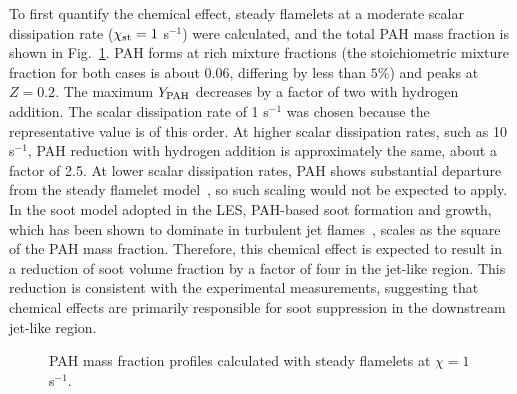 \documentclass[review,3p,times]{elsarticle}
\begin{document}
To first quantify the chemical effect, steady flamelets at a moderate scalar dissipation rate ($\chi_{\rm st} = 1$ s$^{-1}$) were calculated, and the total PAH mass fraction is shown in Fig.~\ref{fig:flamelet}.  PAH forms at rich mixture fractions (the stoichiometric mixture fraction for both cases is about $0.06$, differing by less than $5$\%) and peaks at $Z = 0.2$.  The maximum $Y_{\rm PAH}$ decreases by a factor of two with hydrogen addition.  \textcolor{Rv1}{The scalar dissipation rate of 1 s$^{-1}$ was chosen because the representative value is of this order.  At higher scalar dissipation rates, such as 10 s$^{-1}$, PAH reduction with hydrogen addition is approximately the same, about a factor of 2.5.  At lower scalar dissipation rates, PAH shows substantial departure from the steady flamelet model~\cite{bisetti12}, so such scaling would not be expected to apply.  }In the soot model adopted in the LES, PAH-based soot formation and growth, which has been shown to dominate in turbulent jet flames~\cite{bisetti12,attili14,attili15,mueller12,mueller13}, scales as the square of the PAH mass fraction.  Therefore, this chemical effect is expected to result in a reduction of soot volume fraction by a factor of four in the jet-like region.  This reduction is consistent with the experimental measurements, \textcolor{Rv1}{suggesting that chemical effects are primarily responsible for soot suppression in the downstream jet-like region.}

\begin{figure}[t]
  \centering
  \scriptsize
  \resizebox{0.5\textwidth}{!}{}
  \normalsize
  \vspace{-0.3in}
  \caption{PAH mass fraction profiles calculated with steady flamelets at $\chi = 1$ s$^{-1}$.}
  \label{fig:flamelet}
\end{figure}
\end{document}
